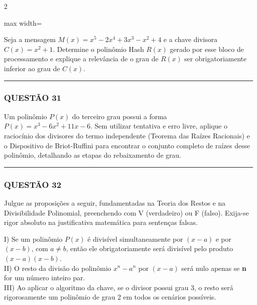 \documentclass[twoside, 10pt, a4paper]{article}
\begin{document}
\begin{multicols*}{2}
\begin{center}
\begin{adjustbox}{max width=\linewidth}
\end{adjustbox}
\end{center}

Seja a mensagem $ M(x) = x^5 - 2x^4 + 3x^3 - x^2 + 4 $ e a chave divisora $ C(x) = x^2 + 1 $. Determine o polinômio Hash $ R(x) $ gerado por esse bloco de processamento e explique a relevância de o grau de $ R(x) $ ser obrigatoriamente inferior ao grau de $ C(x) $.

\vspace{0cm} \noindent\textcolor{CorLinha}{\rule{\linewidth}{0.5pt}} \vspace{-0.2cm}
\subsubsection*{QUESTÃO 31}

Um polinômio $ P(x) $ do terceiro grau possui a forma $ P(x) = x^3 - 6x^2 + 11x - 6 $. Sem utilizar tentativa e erro livre, aplique o raciocínio dos divisores do termo independente (Teorema das Raízes Racionais) e o Dispositivo de Briot-Ruffini para encontrar o conjunto completo de raízes desse polinômio, detalhando as etapas do rebaixamento de grau.

\vspace{0cm} \noindent\textcolor{CorLinha}{\rule{\linewidth}{0.5pt}} \vspace{-0.2cm}
\subsubsection*{QUESTÃO 32}

Julgue as proposições a seguir, fundamentadas na Teoria dos Restos e na Divisibilidade Polinomial, preenchendo com V (verdadeiro) ou F (falso). Exija-se rigor absoluto na justificativa matemática para sentenças falsas.

I) Se um polinômio $ P(x) $ é divisível simultaneamente por $ (x - a) $ e por $ (x - b) $, com $ a \neq b $, então ele obrigatoriamente será divisível pelo produto $ (x - a)(x - b) $.\\[0.3cm]
II) O resto da divisão do polinômio $ x^n - a^n $ por $ (x - a) $ será nulo apenas se \textbf{n} for um número inteiro par.\\[0.3cm]
III) Ao aplicar o algoritmo da chave, se o divisor possui grau 3, o resto será rigorosamente um polinômio de grau 2 em todos os cenários possíveis.


\end{multicols*}
\end{document}
